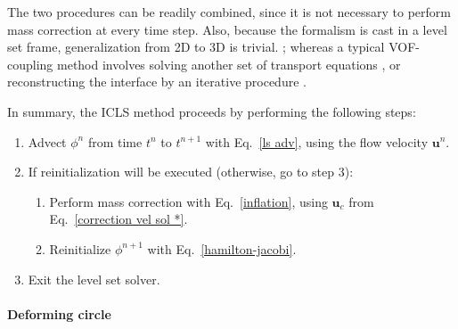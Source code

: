  The two procedures can be readily combined, since it is not necessary to perform mass correction at every time step. Also, because the formalism is cast in a level set frame, generalization from 2D to 3D is trivial. ; whereas a typical VOF-coupling method involves solving another set of transport equations \cite{Sussman_JCP_2000}, or reconstructing the interface by an iterative procedure \cite{Luo_JCP_2015}.

In summary, the ICLS method proceeds by performing the following steps:

\begin{enumerate}
    \item Advect $\phi^{n}$ from time $t^{n}$ to $t^{n+1}$ with Eq.\ \eqref{ls adv}, using the flow velocity ${\bm u}^{n}$.
    
    \item If reinitialization will be executed (otherwise, go to step 3):
      \begin{enumerate}
        \item Perform mass correction with Eq.\ \eqref{inflation}, using ${\bm u}_c$ from Eq.\ \eqref{correction vel sol *}.
        \item Reinitialize $\phi^{n+1}$ with Eq.\ \eqref{hamilton-jacobi}.
      \end{enumerate}
    
    \item Exit the level set solver.
\end{enumerate}


\paragraph {Deforming circle}

